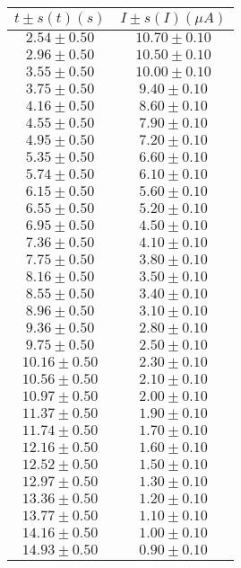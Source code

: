 \begin{table}[H]
\centering
\setlength{\arrayrulewidth}{1.2pt}
\begin{tabular}{|c|c|}
\hline
$t \pm s(t) (s)$ & $I \pm s(I) (\mu A)$ \\
\hline
$2.54 \pm 0.50$ & $10.70 \pm 0.10$ \\
$2.96 \pm 0.50$ & $10.50 \pm 0.10$ \\
$3.55 \pm 0.50$ & $10.00 \pm 0.10$ \\
$3.75 \pm 0.50$ & $9.40 \pm 0.10$ \\
$4.16 \pm 0.50$ & $8.60 \pm 0.10$ \\
$4.55 \pm 0.50$ & $7.90 \pm 0.10$ \\
$4.95 \pm 0.50$ & $7.20 \pm 0.10$ \\
$5.35 \pm 0.50$ & $6.60 \pm 0.10$ \\
$5.74 \pm 0.50$ & $6.10 \pm 0.10$ \\
$6.15 \pm 0.50$ & $5.60 \pm 0.10$ \\
$6.55 \pm 0.50$ & $5.20 \pm 0.10$ \\
$6.95 \pm 0.50$ & $4.50 \pm 0.10$ \\
$7.36 \pm 0.50$ & $4.10 \pm 0.10$ \\
$7.75 \pm 0.50$ & $3.80 \pm 0.10$ \\
$8.16 \pm 0.50$ & $3.50 \pm 0.10$ \\
$8.55 \pm 0.50$ & $3.40 \pm 0.10$ \\
$8.96 \pm 0.50$ & $3.10 \pm 0.10$ \\
$9.36 \pm 0.50$ & $2.80 \pm 0.10$ \\
$9.75 \pm 0.50$ & $2.50 \pm 0.10$ \\
$10.16 \pm 0.50$ & $2.30 \pm 0.10$ \\
$10.56 \pm 0.50$ & $2.10 \pm 0.10$ \\
$10.97 \pm 0.50$ & $2.00 \pm 0.10$ \\
$11.37 \pm 0.50$ & $1.90 \pm 0.10$ \\
$11.74 \pm 0.50$ & $1.70 \pm 0.10$ \\
$12.16 \pm 0.50$ & $1.60 \pm 0.10$ \\
$12.52 \pm 0.50$ & $1.50 \pm 0.10$ \\
$12.97 \pm 0.50$ & $1.30 \pm 0.10$ \\
$13.36 \pm 0.50$ & $1.20 \pm 0.10$ \\
$13.77 \pm 0.50$ & $1.10 \pm 0.10$ \\
$14.16 \pm 0.50$ & $1.00 \pm 0.10$ \\
$14.93 \pm 0.50$ & $0.90 \pm 0.10$ \\

\end{tabular}
\end{table}
